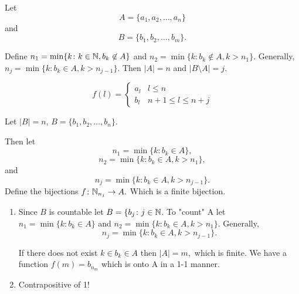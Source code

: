 \documentclass{report}
\begin{document}
  \begin{myproof}
    Let
    $$A = \{a_1, a_2, \dots, a_n\}$$ and
    $$B = \{b_1, b_2, \dots, b_m\}.$$

    Define $n_1=\min \{k \colon k \in \NN, b_k \not \in A\}$ and $n_2 = \min \{k \colon b_k \not \in A, k > n_1\}$. Generally, $n_j = \min \{k : b_k \in A, k > n_{j-1} \}.$ Then $|A|=n$ and $|B \setminus A|=j.$

    $$
f(l) = 
  \begin{cases} 
  a_l &  l \leq n \\
  b_l & n+1 \leq l \leq n+j
   \end{cases}
    $$
  \end{myproof}


  \begin{myproof}
    Let $|B|=n$, $B=\{b_1, b_2,\dots,b_n\}.$

    Then let $$n_1 = \min \{k \colon b_k \in A\},$$
    $$n_2 = \min \{k \colon b_k \in A, k > n_1\},$$ and $$n_j = \min \{k \colon b_k \in A, k > n_{j-1}\}.$$ Define the bijections $f \colon \NN_{n_j} \rightarrow A.$ Which is a finite bijection.
  \end{myproof}



  \begin{myproof}
      \begin{enumerate}

        \item Since $B$ is countable let $B = \{b_j \colon j \in\NN$. To "count" A let $n_1 = \min \{k \colon b_k \in A\}$ and $n_2 = \min \{k \colon b_k \in A, k > n_1\}$. Generally, $$n_j = \min \{k \colon b_k \in A, k > n_{j-1}\}.$$

    If there does not exist $k \in b_k \in A$ then $|A| =m,$ which is finite. We have a function $f(m)= b_{n_m}$ which is onto A in a 1-1 manner. 
  \item Contrapositive of 1!
      \end{enumerate}
  \end{myproof}
\end{document}
